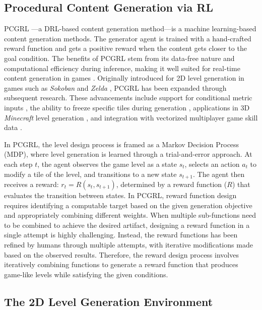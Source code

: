 \subsection{Procedural Content Generation via RL}
PCGRL \cite{khalifa2020pcgrl}---a DRL-based content generation method---is a machine learning-based content generation methods.
The generator agent is trained with a hand-crafted reward function and gets a positive reward when the content gets closer to the goal condition.
The benefits of PCGRL stem from its data-free nature and computational efficiency during inference, making it well suited for real-time content generation in games \cite{togelius2011search}.
Originally introduced for 2D level generation in games such as \textit{Sokoban} and \textit{Zelda} \cite{khalifa2020pcgrl}, PCGRL has been expanded through subsequent research. These advancements include support for conditional metric inputs \cite{earle2021learning}, the ability to freeze specific tiles during generation \cite{earle2024scaling}, applications in 3D \textit{Minecraft} level generation \cite{jiang2022learning}, and integration with vectorized multiplayer game skill data \cite{jeon2023raidenv}.

In PCGRL, the level design process is framed as a Markov Decision Process (MDP), where level generation is learned through a trial-and-error approach. At each step \( t \), the agent observes the game level as a state \( s_t \), selects an action \( a_t \) to modify a tile of the level, and transitions to a new state \( s_{t+1} \).
The agent then receives a reward: $r_t = R(s_t, s_{t+1})$, determined by a reward function ($R$) that evaluates the transition between states.
In PCGRL, reward function design requires identifying a computable target based on the given generation objective and appropriately combining different weights.
When multiple sub-functions need to be combined to achieve the desired artifact, designing a reward function in a single attempt is highly challenging. Instead, the reward functions has been refined by humans through multiple attempts, with iterative modifications made based on the observed results.
Therefore, the reward design process involves iteratively combining functions to generate a reward function that produces game-like levels while satisfying the given conditions.




\subsection{The 2D Level Generation Environment}



